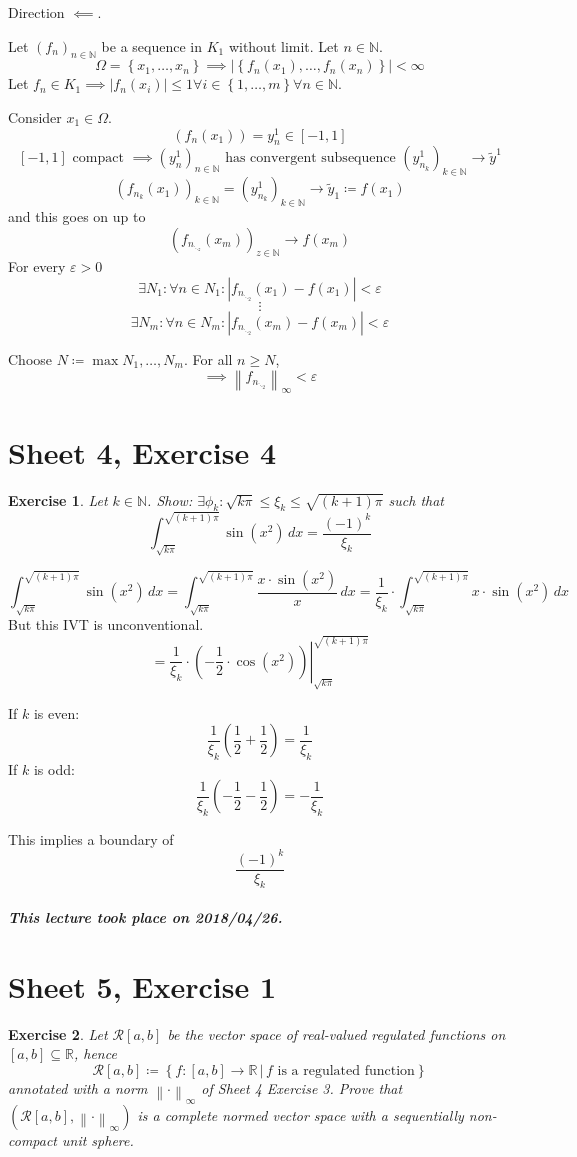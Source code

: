\documentclass{article}
\newtheorem{ex}{Exercise} %
\newcommand{\set}[1]{\left\{#1\right\}}
\newcommand{\setdef}[2]{\left\{\left.#1\,\right|\,#2\right\}}
\newcommand{\norm}[1]{\left\|#1\right\|}
\newcommand{\card}[1]{\left|#1\right|}
\newcommand{\dateref}[1]{\paragraph{\textit{This lecture took place on #1.}}}
\begin{document}
Direction $\impliedby$.

Let $(f_n)_{n \in \mathbb N}$ be a sequence in $K_1$ without limit.
Let $n \in \mathbb N$.
\[ \Omega = \set{x_1, \ldots, x_n} \implies \card{\set{f_n(x_1), \ldots, f_n(x_n)}} < \infty \]
Let $f_n \in K_1 \implies \card{f_n(x_i)} \leq 1 \forall i \in \set{1, \ldots, m} \forall n \in \mathbb N$.

Consider $x_1 \in \Omega$.
\[
  (f_n(x_1)) = y_n^1 \in [-1,1]
\] \[
  [-1,1] \text{ compact }
  \implies (y_n^1)_{n \in \mathbb N} \text{ has convergent subsequence } (y^1_{n_k})_{k \in \mathbb N} \to \tilde y^1
\] \[
  (f_{n_k}(x_1))_{k \in \mathbb N} = (y^1_{n_k})_{k \in \mathbb N} \to \tilde y_1 \coloneqq f(x_1)
\]
and this goes on up to
\[ (f_{n_{\ddots_z}}(x_m))_{z \in \mathbb N} \to f(x_m) \]
For every $\varepsilon > 0$
\[ \exists N_1: \forall n \in N_1: \card{f_{n_{\ddots_{2}}}(x_1) - f(x_1)} < \varepsilon \]
\[ \vdots \]
\[ \exists N_m: \forall n \in N_m: \card{f_{n_{\ddots_{2}}}(x_m) - f(x_m)} < \varepsilon \]

Choose $N \coloneqq \max{N_1, \ldots, N_m}$. For all $n \geq N$,
\[ \implies \norm{f_{n_{\ddots_{2}}}}_{\infty} < \varepsilon \]

\section{Sheet 4, Exercise 4}
\begin{ex}
  Let $k \in \mathbb N$. Show: $\exists \phi_k: \sqrt{k\pi} \leq \xi_k \leq \sqrt{(k+1)\pi}$ such that
  \[ \int_{\sqrt{k\pi}}^{\sqrt{(k+1)\pi}} \sin(x^2) \, dx = \frac{(-1)^k}{\xi_k} \]
\end{ex}

\[
  \int_{\sqrt{k\pi}}^{\sqrt{(k+1)\pi}} \sin(x^2) \, dx
  = \int_{\sqrt{k\pi}}^{\sqrt{(k+1) \pi}} \frac{x \cdot \sin(x^2)}{x} \, dx
  = \frac{1}{\xi_k} \cdot \int_{\sqrt{k\pi}}^{\sqrt{(k+1)\pi}} x \cdot \sin(x^2) \, dx
\]
But this IVT is unconventional.
\[
  = \left. \frac{1}{\xi_k} \cdot \left(-\frac12 \cdot \cos(x^2)\right) \right|_{\sqrt{k\pi}}^{\sqrt{(k+1)\pi}}
\]

If $k$ is even:
\[ \frac{1}{\xi_k} \left(\frac12 + \frac12\right) = \frac{1}{\xi_k} \]
If $k$ is odd:
\[ \frac{1}{\xi_k} \left(-\frac12 - \frac12\right) = -\frac{1}{\xi_k} \]

This implies a boundary of
\[ \frac{(-1)^k}{\xi_k} \]

\dateref{2018/04/26}

\section{Sheet 5, Exercise 1}
\begin{ex}
  Let $\mathcal R[a,b]$ be the vector space of real-valued regulated functions on $[a,b] \subseteq \mathbb R$, hence
  \[ \mathcal R[a,b] \coloneqq \setdef{f: [a,b] \to \mathbb R}{f \text{ is a regulated function}} \]
  annotated with a norm $\norm{\cdot}_\infty$ of Sheet 4 Exercise 3.
  Prove that $(\mathcal R[a,b], \norm{\cdot}_\infty)$
  is a complete normed vector space with a sequentially non-compact unit sphere.
\end{ex}
\end{document}
